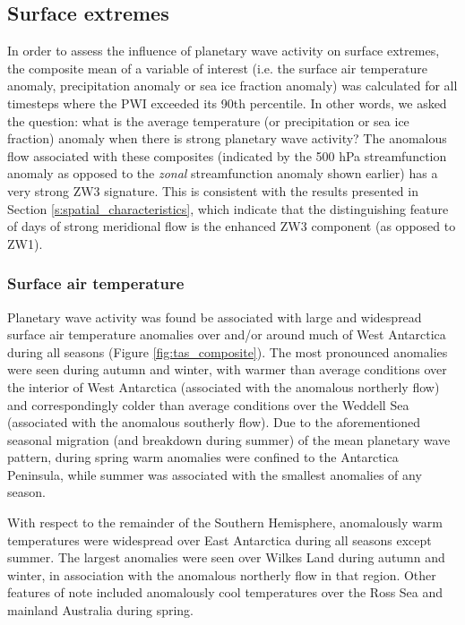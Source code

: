 \subsection{Surface extremes}\label{s:surface_extremes}

In order to assess the influence of planetary wave activity on surface extremes, the composite mean of a variable of interest (i.e. the surface air temperature anomaly, precipitation anomaly or sea ice fraction anomaly) was calculated for all timesteps where the PWI exceeded its 90th percentile. In other words, we asked the question: what is the average temperature (or precipitation or sea ice fraction) anomaly when there is strong planetary wave activity? The anomalous flow associated with these composites (indicated by the 500 hPa streamfunction anomaly as opposed to the \textit{zonal} streamfunction anomaly shown earlier) has a very strong ZW3 signature. This is consistent with the results presented in Section \ref{s:spatial_characteristics}, which indicate that the distinguishing feature of days of strong meridional flow is the enhanced ZW3 component (as opposed to ZW1).  

\subsubsection{Surface air temperature}

Planetary wave activity was found be associated with large and widespread surface air temperature anomalies over and/or around much of West Antarctica during all seasons (Figure \ref{fig:tas_composite}). The most pronounced anomalies were seen during autumn and winter, with warmer than average conditions over the interior of West Antarctica (associated with the anomalous northerly flow) and correspondingly colder than average conditions over the Weddell Sea (associated with the anomalous southerly flow). Due to the aforementioned seasonal migration (and breakdown during summer) of the mean planetary wave pattern, during spring warm anomalies were confined to the Antarctica Peninsula, while summer was associated with the smallest anomalies of any season.  

With respect to the remainder of the Southern Hemisphere, anomalously warm temperatures were widespread over East Antarctica during all seasons except summer. The largest anomalies were seen over Wilkes Land during autumn and winter, in association with the anomalous northerly flow in that region. Other features of note included anomalously cool temperatures over the Ross Sea and mainland Australia during spring.

